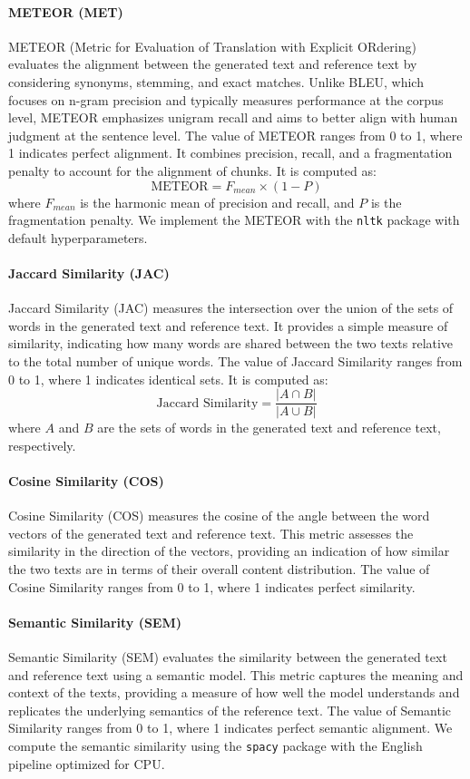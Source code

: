 \paragraph{METEOR (MET)} METEOR (Metric for Evaluation of Translation with Explicit ORdering) evaluates the alignment between the generated text and reference text by considering synonyms, stemming, and exact matches. Unlike BLEU, which focuses on n-gram precision and typically measures performance at the corpus level, METEOR emphasizes unigram recall and aims to better align with human judgment at the sentence level. The value of METEOR ranges from 0 to 1, where 1 indicates perfect alignment. It combines precision, recall, and a fragmentation penalty to account for the alignment of chunks. It is computed as:
\[
\text{METEOR} = F_{mean} \times (1 - P)
\]
where \(F_{mean}\) is the harmonic mean of precision and recall, and $P$ is the fragmentation penalty. We implement the METEOR with the \texttt{nltk} package with default hyperparameters.

\paragraph{Jaccard Similarity (JAC)}
Jaccard Similarity (JAC) measures the intersection over the union of the sets of words in the generated text and reference text. It provides a simple measure of similarity, indicating how many words are shared between the two texts relative to the total number of unique words. The value of Jaccard Similarity ranges from 0 to 1, where 1 indicates identical sets. It is computed as:
\[
\text{Jaccard Similarity} = \frac{|A \cap B|}{|A \cup B|}
\]
where \(A\) and \(B\) are the sets of words in the generated text and reference text, respectively. 

\paragraph{Cosine Similarity (COS)}
Cosine Similarity (COS) measures the cosine of the angle between the word vectors of the generated text and reference text. This metric assesses the similarity in the direction of the vectors, providing an indication of how similar the two texts are in terms of their overall content distribution. The value of Cosine Similarity ranges from 0 to 1, where 1 indicates perfect similarity. 

\paragraph{Semantic Similarity (SEM)}
Semantic Similarity (SEM) evaluates the similarity between the generated text and reference text using a semantic model. This metric captures the meaning and context of the texts, providing a measure of how well the model understands and replicates the underlying semantics of the reference text. The value of Semantic Similarity ranges from 0 to 1, where 1 indicates perfect semantic alignment. We compute the semantic similarity using the \texttt{spacy} package with the English pipeline optimized for CPU.

